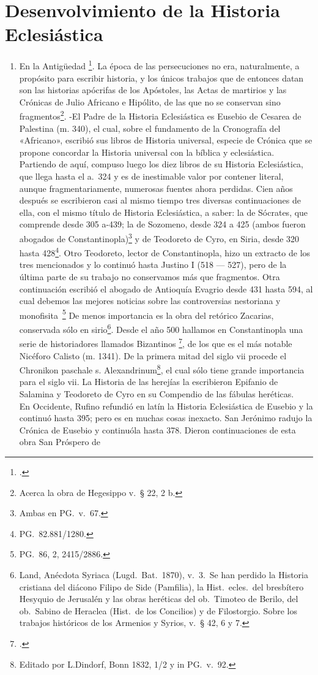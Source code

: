 \raggedbottom{} \documentclass[12pt, a4paper]{book}
\begin{document}
\section{Desenvolvimiento de la Historia Eclesiástica}
\begin{enumerate}
  \item En la Antigüedad \footcite{Bardenhewer1901Patrologia}. La época de las persecuciones no era, naturalmente, a propósito para escribir historia, y los únicos trabajos que de entonces datan son las historias apócrifas de los Apóstoles, las Actas de martirios y las Crónicas de Julio Africano e Hipólito, de las que no se conservan sino fragmentos\footnote{Acerca la obra de Hegesippo v.\ § 22, 2 b.}. -El Padre de la Historia Eclesiástica es Eusebio de Cesarea de Palestina (m. 340), el cual, sobre el fundamento de la Cronografía del «Africano», escribió sus libros de Historia universal, especie de Crónica que se propone concordar la Historia universal con la bíblica y eclesiástica. Partiendo de aquí, compuso luego los diez libros de su Historia Eclesiástica, que llega hasta el a.\ 324 y es de inestimable valor por contener literal, aunque fragmentariamente, numerosas fuentes ahora perdidas. Cien años después se escribieron casi al mismo tiempo tres diversas continuaciones de ella, con el mismo título de Historia Eclesiástica, a saber: la de Sócrates, que comprende desde 305 a-439; la de Sozomeno, desde 324 a 425 (ambos fueron abogados de Constantinopla)\footnote{Ambas en PG.\ v.\ 67.} y de Teodoreto de Cyro, en Siria, desde 320 hasta 428\footnote{PG.\ 82.881/1280.}. Otro Teodoreto, lector de Constantinopla, hizo un extracto de los tres mencionados y lo continuó hasta Justino I (518 --- 527), pero de la última parte de su trabajo no conservamos más que fragmentos. Otra continuación escribió el abogado de Antioquía Evagrio desde 431 hasta 594, al cual debemos las mejores noticias sobre las controversias nestoriana y monofisita\ \footnote{PG.\ 86, 2, 2415/2886.} De menos importancia es la obra del retórico Zacarias, conservada sólo en sirio\footnote{Land, Anécdota Syriaca (Lugd.\ Bat.\ 1870), v.\ 3.\ Se han perdido la Historia cristiana del diácono Filipo de Side (Pamfilia), la Hist.\ ecles.\ del bresbítero Hesyquio de Jerusalén y las obras heréticas del ob.\ Timoteo de Berilo, del ob.\ Sabino de Heraclea (Hist.\ de los Concilios) y de Filostorgio. Sobre los trabajos históricos de los Armenios y Syrios, v.\ § 42, 6 y 7.}. Desde el año 500 hallamos en Constantinopla una serie de historiadores llamados Bizantinos \footcite{Niebuhr1829Corpus}, de los que es el más notable Nicéforo Calisto (m. 1341). De la primera mitad del siglo vii procede el Chronikon paschale s. Alexandrinum\footnote{Editado por L.\@ Dindorf, Bonn 1832, 1/2 y in PG.\ v.\ 92.}, el cual sólo tiene grande importancia para el siglo vii. La Historia de las herejías la escribieron Epifanio de Salamina y Teodoreto de Cyro en su Compendio de las fábulas heréticas.\\ En Occidente, Rufino refundió en latín la Historia Eclesiástica de Eusebio y la continuó hasta 395; pero es en muchas cosas inexacto. San Jerónimo radujo la Crónica de Eusebio y continuóla hasta 378. Dieron continuaciones de esta obra San Próspero de 
\end{enumerate}
\end{document}
